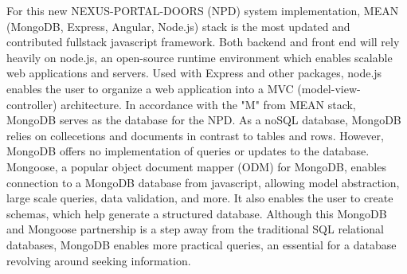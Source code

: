 \documentclass[10pt,twocolumn,twoside]{article}
\begin{document}

	For this new NEXUS-PORTAL-DOORS (NPD) system implementation, MEAN (MongoDB, Express, Angular, Node.js)  stack is the most updated and contributed fullstack javascript framework. Both backend and front end will rely heavily on node.js, an open-source runtime environment which enables scalable web applications and servers. Used with Express and other packages, node.js enables the user to organize a web application into a MVC (model-view-controller) architecture. In accordance with the "M" from MEAN stack, MongoDB serves as the database for the NPD. As a noSQL database, MongoDB relies on collecetions and documents in contrast to tables and rows. However, MongoDB offers no implementation of queries or updates to the database. Mongoose, a popular object document mapper (ODM) for MongoDB, enables connection to a MongoDB database from javascript, allowing model abstraction, large scale queries, data validation, and more. It also enables the user to create schemas, which help generate a structured database. Although this MongoDB and Mongoose partnership is a step away from the traditional SQL relational databases, MongoDB enables more practical queries, an essential for a database revolving around seeking information.\newline
	
\end{document}
